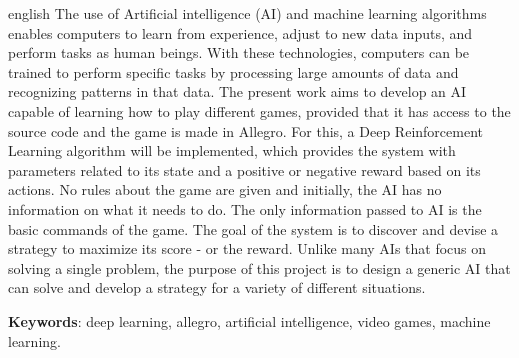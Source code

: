 \begin{resumo}[Abstract]
 \begin{otherlanguage*}{english}
	The use of Artificial intelligence (AI) and machine learning algorithms enables computers to learn from experience, adjust to new data inputs, and perform tasks as human beings. With these technologies, computers can be trained to perform specific tasks by processing large amounts of data and recognizing patterns in that data.
	The present work aims to develop an AI capable of learning how to play different games, provided that it has access to the source code and the game is made in Allegro. For this, a Deep Reinforcement Learning algorithm will be implemented, which provides the system with parameters related to its state and a positive or negative reward based on its actions. No rules about the game are given and initially, the AI has no information on what it needs to do. The only information passed to AI is the basic commands of the game. The goal of the system is to discover and devise a strategy to maximize its score - or the reward. Unlike many AIs that focus on solving a single problem, the purpose of this project is to design a generic AI that can solve and develop a strategy for a variety of different situations.

   	\vspace{\onelineskip}

   	\noindent 
   	\textbf{Keywords}: deep learning, allegro, artificial intelligence, video games, machine learning.
 \end{otherlanguage*}
\end{resumo}

 

  
